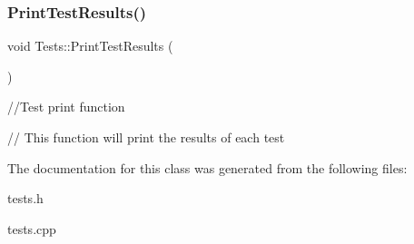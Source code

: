 \subsubsection{\texorpdfstring{Print\+Test\+Results()}{PrintTestResults()}}
{\footnotesize\ttfamily void Tests\+::\+Print\+Test\+Results (\begin{DoxyParamCaption}{ }\end{DoxyParamCaption})}



//\+Test print function 

// This function will print the results of each test 

The documentation for this class was generated from the following files\+:\begin{DoxyCompactItemize}
\item 
tests.\+h\item 
tests.\+cpp\end{DoxyCompactItemize}
